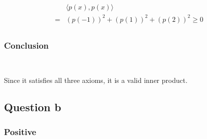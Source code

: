 \documentclass{article}
\begin{document}
\begin{equation*}
    \begin{split}
        &\langle p(x),p(x)\rangle\\
        =&(p(-1))^2+(p(1))^2+(p(2))^2\geq0\\
    \end{split}
\end{equation*}

\subsubsection{Conclusion}

~

Since it satisfies all three axioms, it is a valid inner product.

\subsection{Question b}

\subsubsection{Positive}

~
\end{document}

